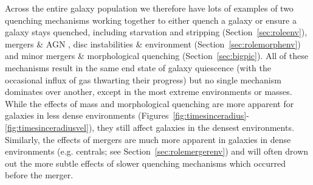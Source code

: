 \documentclass[useAMS,usenatbib]{mn2e}
\begin{document}
Across the entire galaxy population we therefore have lots of examples of two quenching mechanisms working together to either quench a galaxy or ensure a galaxy stays quenched, including starvation and stripping (Section~\ref{sec:roleenv}), mergers \& AGN \citep{smethurst15, smethurst16}, disc instabilities \&  environment (Section~\ref{sec:rolemorphenv}) and minor mergers \& morphological quenching (Section~\ref{sec:bigpic}). All of these mechanisms result in the same end state of galaxy quiescence (with the occasional influx of gas thwarting their progress) but no single mechanism dominates over another, except in the most extreme environments or masses. While the effects of mass and morphological quenching are more apparent for galaxies in less dense environments (Figures~\ref{fig:timesinceradius}-\ref{fig:timesinceradiusvel}), they still affect galaxies in the densest environments. Similarly, the effects of mergers are much more apparent in galaxies in dense environments (e.g. centrals; see Section~\ref{sec:rolemergerenv}) and will often drown out the more subtle effects of slower quenching mechanisms which occurred before the merger. %

\end{document}
